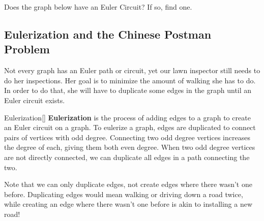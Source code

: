\begin{exercise}{}{}%
Does the graph below have an Euler Circuit?  If so, find one.\\

\end{exercise}


\subsection{Eulerization and the Chinese Postman Problem}
Not every graph has an Euler path or circuit, yet our lawn inspector still needs to do her inspections.  Her goal is to minimize the amount of walking she has to do.  In order to do that, she will have to duplicate some edges in the graph until an Euler circuit exists. 

\begin{definition}{Eulerization}{}[]
\textbf{Eulerization} is the process of adding edges to a graph to create an Euler circuit on a graph.  To eulerize a graph, edges are duplicated to connect pairs of vertices with odd degree.  Connecting two odd degree vertices increases the degree of each, giving them both even degree.  When two odd degree vertices are not directly connected, we can duplicate all edges in a path connecting the two.
\end{definition}

Note that we can only duplicate edges, not create edges where there wasn't one before.  Duplicating edges would mean walking or driving down a road twice, while creating an edge where there wasn't one before is akin to installing a new road!


